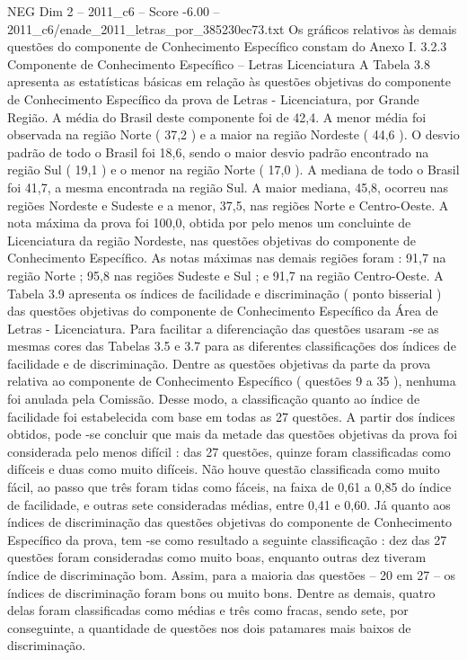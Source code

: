 \begin{textsample}{NEG Dim 2 – 2011\_c6 – Score -6.00 – 2011\_c6/enade\_2011\_letras\_por\_385230ec73.txt}
Os gráficos relativos às demais questões do componente de Conhecimento Específico constam do Anexo I. 3.2.3 Componente de Conhecimento Específico – Letras Licenciatura A Tabela 3.8 apresenta as estatísticas básicas em relação às questões objetivas do componente de Conhecimento Específico da prova de Letras - Licenciatura, por Grande Região.
A média do Brasil deste componente foi de 42,4.
A menor média foi observada na região Norte ( 37,2 ) e a maior na região Nordeste ( 44,6 ).
O desvio padrão de todo o Brasil foi 18,6, sendo o maior desvio padrão encontrado na região Sul ( 19,1 ) e o menor na região Norte ( 17,0 ).
A mediana de todo o Brasil foi 41,7, a mesma encontrada na região Sul.
A maior mediana, 45,8, ocorreu nas regiões Nordeste e Sudeste e a menor, 37,5, nas regiões Norte e Centro-Oeste.
A nota máxima da prova foi 100,0, obtida por pelo menos um concluinte de Licenciatura da região Nordeste, nas questões objetivas do componente de Conhecimento Específico.
As notas máximas nas demais regiões foram : 91,7 na região Norte ; 95,8 nas regiões Sudeste e Sul ; e 91,7 na região Centro-Oeste.
A Tabela 3.9 apresenta os índices de facilidade e discriminação ( ponto bisserial ) das questões objetivas do componente de Conhecimento Específico da Área de Letras - Licenciatura.
Para facilitar a diferenciação das questões usaram -se as mesmas cores das Tabelas 3.5 e 3.7 para as diferentes classificações dos índices de facilidade e de discriminação.
Dentre as questões objetivas da parte da prova relativa ao componente de Conhecimento Específico ( questões 9 a 35 ), nenhuma foi anulada pela Comissão.
Desse modo, a classificação quanto ao índice de facilidade foi estabelecida com base em todas as 27 questões.
A partir dos índices obtidos, pode -se concluir que mais da metade das questões objetivas da prova foi considerada pelo menos difícil : das 27 questões, quinze foram classificadas como difíceis e duas como muito difíceis.
Não houve questão classificada como muito fácil, ao passo que três foram tidas como fáceis, na faixa de 0,61 a 0,85 do índice de facilidade, e outras sete consideradas médias, entre 0,41 e 0,60.
Já quanto aos índices de discriminação das questões objetivas do componente de Conhecimento Específico da prova, tem -se como resultado a seguinte classificação : dez das 27 questões foram consideradas como muito boas, enquanto outras dez tiveram índice de discriminação bom.
Assim, para a maioria das questões – 20 em 27 – os índices de discriminação foram bons ou muito bons.
Dentre as demais, quatro delas foram classificadas como médias e três como fracas, sendo sete, por conseguinte, a quantidade de questões nos dois patamares mais baixos de discriminação.

\end{textsample}
